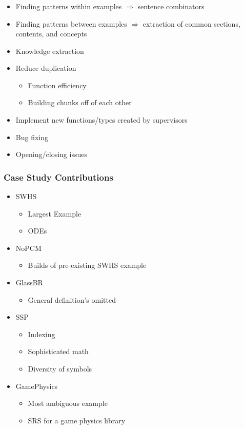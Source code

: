\documentclass{beamer}
\begin{document}
\begin{frame}
\frametitle{}
\begin{itemize}
 \item<1-> Finding patterns within examples $\Rightarrow$ sentence combinators
 \item<2-> Finding patterns between examples $\Rightarrow$ extraction of common sections, contents, and concepts
 \item<3-> Knowledge extraction
 \item<4-> Reduce duplication
   \begin{itemize}
     \item Function efficiency
     \item Building chunks off of each other
   \end{itemize}
 \item<5-> Implement new functions/types created by supervisors
 \item<6-> Bug fixing
 \item<7-> Opening/closing issues
\end{itemize}
\end{frame}

\begin{frame}
\frametitle{Case Study Contributions}
\begin{itemize}
\item<1-> SWHS
  \begin{itemize}
    \item Largest Example
    \item ODEs
  \end{itemize}
\item<2-> NoPCM
  \begin{itemize}
    \item Builds of pre-existing SWHS example
  \end{itemize}
\item<3-> GlassBR
  \begin{itemize}
    \item General definition's omitted
  \end{itemize}
\item<4-> SSP
  \begin{itemize}
    \item Indexing
    \item Sophisticated math
    \item Diversity of symbols
  \end{itemize}
\item<5-> GamePhysics
  \begin{itemize}
    \item Most ambiguous example
    \item SRS for a game physics library
  \end{itemize}
\end{itemize}
\end{frame}
\end{document}
